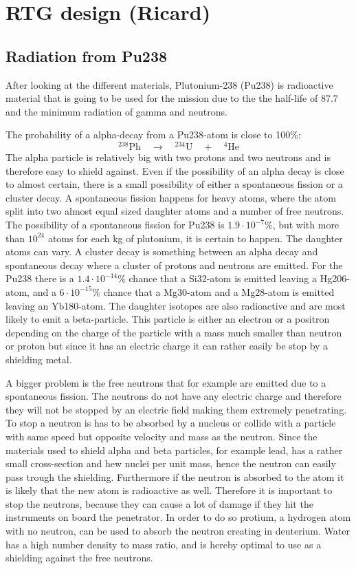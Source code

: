 \section{RTG design (Ricard)}

\subsection{Radiation from Pu238}
After looking at the different materials, Plutonium-238 (Pu238) is radioactive material that is going to be used for the mission due to the the half-life of 87.7 and the minimum radiation of gamma and neutrons. 

The probability of a alpha-decay from a Pu238-atom is close to 100\%: 
\begin{equation}
^{238}\text{Ph} \quad \rightarrow \quad ^{234}\text{U} \quad + \quad ^4 \text{He}
\end{equation}
The alpha particle is relatively big with two protons and two neutrons and is therefore easy to shield against. Even if the possibility of an alpha decay is close to almost certain, there is a small possibility of either a spontaneous fission or a cluster decay. A spontaneous fission happens for heavy atoms, where the atom split into two almost equal sized daughter atoms and a number of free neutrons. The possibility of a spontaneous fission for Pu238 is $1.9 \cdot 10^{-7}\%$, but with more than $10^{24}$ atoms for each kg of plutonium, it is certain to happen. The daughter atoms can vary. A cluster decay is something between an alpha decay and spontaneous decay where a cluster of protons and neutrons are emitted. For the Pu238 there is a $1.4 \cdot 10^{-14}\%$ chance that a Si32-atom is emitted leaving a Hg206-atom, and a $6 \cdot 10^{-15}\%$ chance that a Mg30-atom and a Mg28-atom is emitted leaving an Yb180-atom. The daughter isotopes are also radioactive and are most likely to emit a beta-particle. This particle is either an electron or a positron depending on the charge of the particle with a mass much smaller than neutron or proton but since it has an electric charge it can rather easily be stop by a shielding metal. 

A bigger problem is the free neutrons that for example are emitted due to a spontaneous fission.  The neutrons do not have any electric charge and therefore they will not be stopped by an electric field making them extremely penetrating. To stop a neutron is has to be absorbed by a nucleus or collide with a particle with same speed but opposite velocity and mass as the neutron. Since the materials used to shield alpha and beta particles, for example lead, has a rather small cross-section and hew nuclei per unit mass, hence the neutron can easily pass trough the shielding. Furthermore if the neutron is absorbed to the atom it is likely that the new atom is radioactive as well. Therefore it is important to stop the neutrons, because they can cause a lot of damage if they hit the instruments on board the penetrator. In order to do so protium, a hydrogen atom with no neutron, can be used to absorb the neutron creating in deuterium. Water has a high number density to mass ratio, and is hereby optimal to use as a shielding against the free neutrons. 


